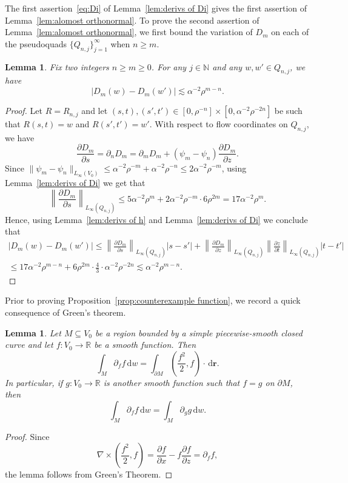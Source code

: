 \documentclass[11pt,reqno]{amsart}
\newcommand{\N}{\mathbb{N}}
\newcommand{\R}{\mathbb{R}}
\newcommand{\ud}[0]{\,\mathrm{d}}
\newcommand{\0}{\mathbf{0}}
\renewcommand{\1}{\mathbf 1}
\newcommand{\from}{\colon}
\renewcommand{\subset}{\subseteq}
\renewcommand{\ge}{\geqslant}
\renewcommand{\le}{\leqslant}
\newtheorem{lemma}[thm]{Lemma}
\theoremstyle{remark}
\newcommand{\pd}[2]{\frac{\partial #2}{\partial #1}}
\begin{document}
The first assertion~\eqref{eq:Di} of Lemma~\ref{lem:derivs of Di} gives the first assertion of Lemma~\ref{lem:alomost orthonormal}. To prove the second assertion of Lemma~\ref{lem:alomost orthonormal}, we first bound  the variation of $D_m$ on each of the pseudoquads $\{Q_{n,j}\}_{j=1}^\infty$ when $n\ge m$.
\begin{lemma}\label{lem:variation of Di} Fix two integers $n\ge m\ge 0$. For any $j\in \N$ and any $w,w'\in Q_{n,j}$, we have $$|D_m(w)-D_m(w')|\lesssim \alpha^{-2} \rho^{m-n}.$$
\end{lemma}
\begin{proof}
  Let $R=R_{n,j}$ and let $(s,t),(s',t')\in [0,\rho^{-n}]\times [0,\alpha^{-2}\rho^{-2n}]$ be such that $R(s,t)=w$ and $R(s',t')=w'$.  With respect to flow coordinates on $Q_{n,j}$, we have
  $$\pd{s}{D_m} = \partial_n D_m = \partial_m D_m+(\psi_m-\psi_n)\frac{\partial D_m}{\partial z}.$$
  Since $\|\psi_m-\psi_n\|_{L_\infty(V_0)} \le \alpha^{-2}\rho^{-m}+\alpha^{-2}\rho^{-n}\le 2\alpha^{-2}\rho^{-m}$, using Lemma~\ref{lem:derivs of Di} we get that
  \begin{equation*}
    \left\|\pd{s}{D_m}\right\|_{L_\infty(Q_{n,j})}  \le 5\alpha^{-2}\rho^{m}+2 \alpha^{-2}\rho^{-m}\cdot 6\rho^{2m}=17 \alpha^{-2}\rho^{m}.
  \end{equation*}
Hence, using Lemma~\ref{lem:derivs of h} and Lemma~\ref{lem:derivs of Di} we conclude that
  \begin{multline*}
    |D_m(w)-D_m(w')|\le \left\|\pd{s}{D_m}\right\|_{L_\infty(Q_{n,j})} |s-s'|  + \left\|\frac{\partial D_m }{\partial z}\right\|_{L_\infty(Q_{n,j})} \left\|\frac{\partial z }{\partial t}\right\|_{L_\infty(Q_{n,j})}|t-t'| \\
    \le 17 \alpha^{-2} \rho^{m-n}+ 6\rho^{2m}\cdot \frac{4}{3}\cdot \alpha^{-2}\rho^{-2n}\lesssim \alpha^{-2} \rho^{m-n}.\tag*{\qedhere}
  \end{multline*}
\end{proof}

Prior to proving Proposition~\ref{prop:counterexample function}, we record a quick consequence of Green's theorem.
\begin{lemma}\label{lem:Heisenberg Stokes}
  Let $M\subset V_0$ be a region bounded by a simple piecewise-smooth closed curve and let $f\from V_0\to \R$ be a smooth function.  Then
  $$\int_{M} \partial_f f \ud w=\int_{\partial M} \left(\frac{f^2}{2},f\right)\cdot \ud \mathbf{r}.$$
  In particular, if $g\from V_0\to \R$ is another smooth function such that $f=g$ on $\partial M$, then $$\int_{M} \partial_f f \ud w=\int_{M} \partial_g g \ud w.$$
\end{lemma}
\begin{proof}
  Since
  $$\nabla\times \left(\frac{f^2}{2},f\right)=\frac{\partial f}{\partial x}- f\frac{\partial f}{\partial z}=\partial_f f,$$
  the lemma follows from Green's Theorem.
\end{proof}
\end{document}
